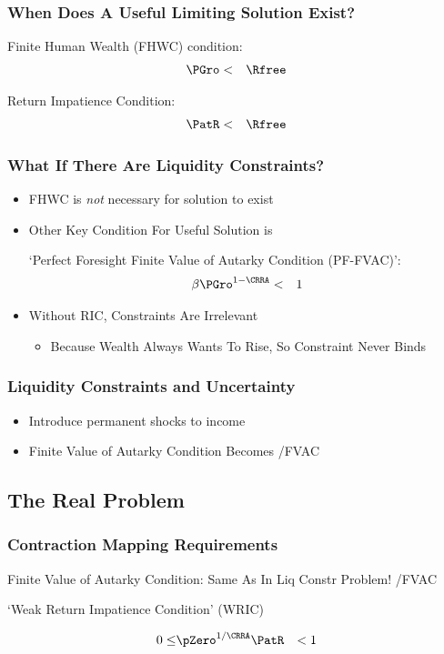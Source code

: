 \documentclass[pdflatex]{beamer}\providecommand{\texname}{BufferStockTheorySlides}%
\begin{document}
\begin{frame}
\frametitle{When Does A Useful Limiting Solution Exist?}

Finite Human Wealth (FHWC) condition:
\begin{eqnarray}
\PGro & < & \Rfree
\end{eqnarray}

\pause\medskip
Return Impatience Condition:
\begin{eqnarray}
\PatR & < & \Rfree
\end{eqnarray}

\end{frame}

\begin{frame}
\frametitle{What If There Are Liquidity Constraints?}

\pause 

\begin{itemize}
\item FHWC is {\it not} necessary for solution to exist
\item Other Key Condition For Useful Solution is

`Perfect Foresight Finite Value of Autarky Condition (PF-FVAC)':
\begin{eqnarray}
\beta \PGro^{1-\CRRA} & < & 1  
\end{eqnarray}

\item Without RIC, Constraints Are Irrelevant
\begin{itemize}
\item Because Wealth Always Wants To Rise, So Constraint Never Binds
\end{itemize}
\end{itemize}

\end{frame}

\begin{frame}
\frametitle{Liquidity Constraints and Uncertainty}

\begin{itemize}
\item Introduce permanent shocks to income
\item Finite Value of Autarky Condition Becomes
 \EqDir/FVAC
\end{itemize}

\end{frame}



\subsection{The Real Problem}
\begin{frame}
\frametitle{Contraction Mapping Requirements}

Finite Value of Autarky Condition: Same As In Liq Constr Problem!
 \EqDir/FVAC

`Weak Return Impatience Condition' (WRIC)

\begin{eqnarray}
 0 \leq & \pZero^{1/\CRRA} \PatR & < 1 \label{eq:WRIC}
\end{eqnarray}

\end{frame}
\end{document}
